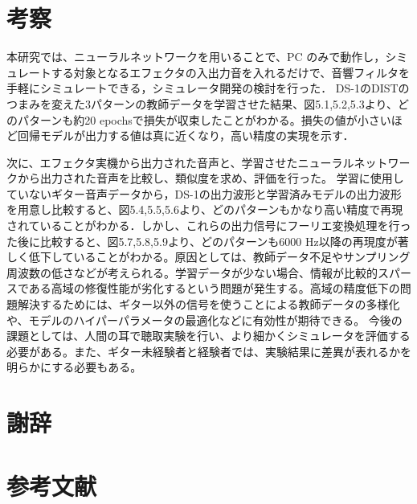 \documentclass{jreport}		%
\begin{document}
\chapter{考察}
本研究では、ニューラルネットワークを用いることで、PC のみで動作し，シミュレートする対象となるエフェクタの入出力音を入れるだけで、音響フィルタを手軽にシミュレートできる，シミュレータ開発の検討を行った．
DS-1のDISTのつまみを変えた3パターンの教師データを学習させた結果、図5.1,5.2,5.3より、どのパターンも約20 epochsで損失が収束したことがわかる。損失の値が小さいほど回帰モデルが出力する値は真に近くなり，高い精度の実現を示す．

次に、エフェクタ実機から出力された音声と、学習させたニューラルネットワークから出力された音声を比較し、類似度を求め、評価を行った。
学習に使用していないギター音声データから，DS-1の出力波形と学習済みモデルの出力波形を用意し比較すると、図5.4,5.5,5.6より、どのパターンもかなり高い精度で再現されていることがわかる．しかし、これらの出力信号にフーリエ変換処理を行った後に比較すると、図5.7,5.8,5.9より、どのパターンも6000 Hz以降の再現度が著しく低下していることがわかる。原因としては、教師データ不足やサンプリング周波数の低さなどが考えられる。学習データが少ない場合、情報が比較的スパースである高域の修復性能が劣化するという問題が発生する。高域の精度低下の問題解決するためには、ギター以外の信号を使うことによる教師データの多様化や、モデルのハイパーパラメータの最適化などに有効性が期待できる。
今後の課題としては、人間の耳で聴取実験を行い、より細かくシミュレータを評価する必要がある。また、ギター未経験者と経験者では、実験結果に差異が表れるかを明らかにする必要もある。

\chapter*{謝辞}

\chapter*{参考文献}
\end{document}

